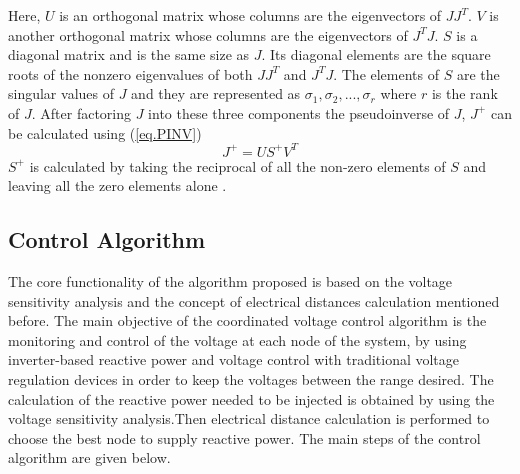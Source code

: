 Here, $U$ is an orthogonal matrix whose columns are the eigenvectors of $JJ^T$. $V$ is another orthogonal matrix whose columns are the eigenvectors of $J^{T}J$. $S$ is a diagonal matrix and is the same size as $J$. Its diagonal elements are the square roots of the nonzero eigenvalues of both $JJ^T$ and $J^{T}J$. The elements of $S$ are the singular values of $J$ and they are represented as $\sigma_1, \sigma_2, ..., \sigma_r$ where $r$ is the rank of $J$. After factoring $J$ into these three components the pseudoinverse of $J$, $J^+$ can be calculated using (\ref{eq.PINV}) \cite{PINV}
\begin{equation}\label{eq.PINV}
    J^+ = US^{+}V^T
\end{equation}
$S^+$ is calculated by taking the reciprocal of all the non-zero elements of $S$ and leaving all the zero elements alone \cite{PINV}.  


\subsection{Control Algorithm}
The core functionality of the algorithm proposed is based on the voltage sensitivity analysis and the concept of electrical distances calculation mentioned before. The main objective of the coordinated voltage control algorithm is the monitoring and control of the voltage at each node of the system, by using inverter-based reactive power and voltage control with traditional voltage regulation devices in order to keep the voltages between the range desired. The calculation of the reactive power needed to be injected is obtained by using the voltage sensitivity analysis.Then electrical distance calculation is performed to choose the best node to supply reactive power. The main steps of the control algorithm are given below.

